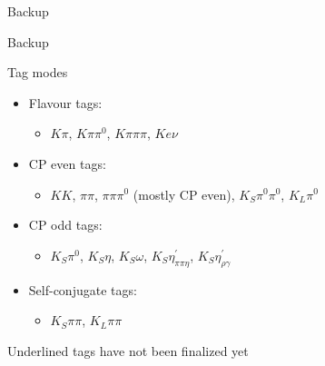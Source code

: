 \documentclass{beamer}
\begin{document}
\begin{frame}{Backup}
  \begin{center}
    {\huge Backup}
  \end{center}
\end{frame}

\renewcommand*{\thefootnote}{\fnsymbol{footnote}}
\begin{frame}{Tag modes}
  \begin{itemize}
    \setlength\itemsep{1.0em}
    \item{Flavour tags:}
    \begin{itemize}
      \item{$K\pi$, $K\pi\pi^0$, $K\pi\pi\pi$, \underline{$Ke\nu$}}
    \end{itemize}
    \item{CP even tags:}
    \begin{itemize}
      \item{$KK$, $\pi\pi$, $\pi\pi\pi^0$ (mostly CP even), $K_S\pi^0\pi^0$, $K_L\pi^0$}
    \end{itemize}
    \item{CP odd tags:}
    \begin{itemize}
      \item{$K_S\pi^0$, $K_S\eta$, $K_S\omega$, $K_S\eta^\prime_{\pi\pi\eta}$, $K_S\eta^\prime_{\rho\gamma}$}
    \end{itemize}
    \item{Self-conjugate tags:}
    \begin{itemize}
      \item{$K_S\pi\pi$, $K_L\pi\pi$}
    \end{itemize}
  \end{itemize}
  Underlined tags have not been finalized yet
\end{frame}
\end{document}
